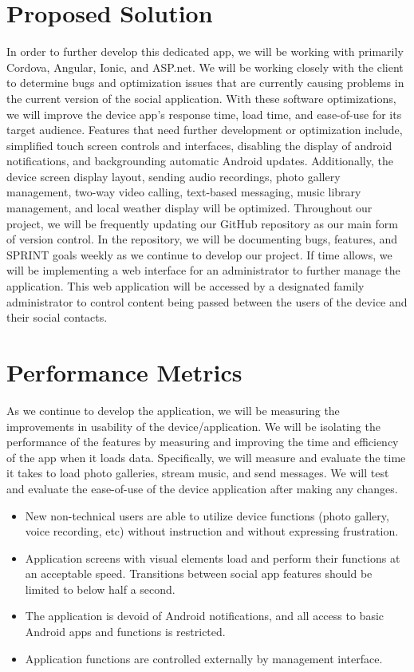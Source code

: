 \documentclass[letterpaper,10pt,draftclsnofoot,onecolumn]{IEEEtran}
\begin{document}
\newpage
\section*{Proposed Solution}
In order to further develop this dedicated app, we will be working with primarily Cordova, Angular, Ionic, and ASP.net. We will be working closely with the client to determine bugs and optimization issues that are currently causing problems in the current version of the social application. With these software optimizations, we will improve the device app’s response time, load time, and ease-of-use for its target audience.
\bigbreak
Features that need further development or optimization include, simplified touch screen controls and interfaces, disabling the display of android notifications, and backgrounding automatic Android updates. Additionally, the device screen display layout, sending audio recordings, photo gallery management, two-way video calling, text-based messaging, music library management, and local weather display will be optimized.
\bigbreak
Throughout our project, we will be frequently updating our GitHub repository as our main form of version control. In the repository, we will be documenting bugs, features, and SPRINT goals weekly as we continue to develop our project. If time allows, we will be implementing a web interface for an administrator to further manage the application. This web application will be accessed by a designated family administrator to control content being passed between the users of the device and their social contacts.
\bigbreak
\section*{Performance Metrics}
As we continue to develop the application, we will be measuring the improvements in usability of the device/application. We will be isolating the performance of the features by measuring and improving the time and efficiency of the app when it loads data. Specifically, we will measure and evaluate the time it takes to load photo galleries, stream music, and send messages. We will test and evaluate the ease-of-use of the device application after making any changes.
\newline
\begin{itemize}
	\item New non-technical users are able to utilize device functions (photo gallery, voice recording, etc) without instruction and without expressing frustration. 
	\item Application screens with visual elements load and perform their functions at an acceptable speed. Transitions between social app features should be limited to below half a second.
	\item The application is devoid of Android notifications, and all access to basic Android apps and functions is restricted.
	\item Application functions are controlled externally by management interface.
\end{itemize}

\nocite{*}


\end{document}
